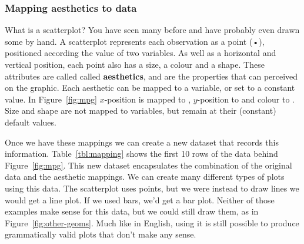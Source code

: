% 
% 


\subsubsection{Mapping aesthetics to data}

What is a scatterplot?  You have seen many before and have probably even drawn some by hand.  A scatterplot represents each observation as a point (•), positioned according the value of two variables.  As well as a horizontal and vertical position, each point also has a size, a colour and a shape. These attributes are called called {\bf aesthetics}, and are the properties that can perceived on the graphic.  Each aesthetic can be mapped to a variable, or set to a constant value.  In Figure~\ref{fig:mpg} $x$-position is mapped to , $y$-position to  and colour to .  Size and shape are not mapped to variables, but remain at their (constant) default values.  

Once we have these mappings we can create a new dataset that records this information.  Table~\ref{tbl:mapping} shows the first 10 rows of the data behind Figure~\ref{fig:mpg}.  This new dataset encapsulates the combination of the original data and the aesthetic mappings.  We can create many different types of plots using this data.  The scatterplot uses points, but we were instead to draw lines we would get a line plot.  If we used bars, we'd get a bar plot.  Neither of those examples make sense for this data, but we could still draw them, as in Figure~\ref{fig:other-geoms}.  Much like in English, using \ggplot it is still possible to produce grammatically valid plots that don't make any sense.

